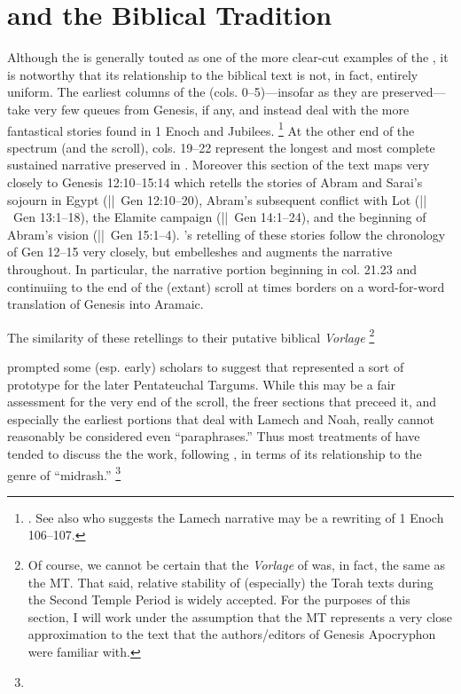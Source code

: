 \section{\ga and the Biblical Tradition}

Although the \ga is generally touted as one of the more clear-cut examples of the \rwb, it is notworthy that its relationship to the biblical text is not, in fact, entirely uniform. The earliest columns of the \ga (cols. 0--5)---insofar as they are preserved---take very few queues from Genesis, if any, and instead deal with the more fantastical stories found in 1 Enoch and Jubilees.%
%
\footnote{\cite[333]{bernstein_berthelot-etal2010}. See also \cite[174]{nickelsburg2005} who suggests the Lamech narrative may be a rewriting of 1 Enoch 106--107.}
At the other end of the spectrum (and the scroll), cols. 19--22 represent the longest and most complete sustained narrative preserved in \ga. Moreover this section of the text maps very closely to Genesis 12:10--15:14 which retells the stories of Abram and Sarai's sojourn in Egypt (||~Gen 12:10--20), Abram's subsequent conflict with Lot (||~Gen 13:1--18), the Elamite campaign (||~Gen 14:1--24), and the beginning of Abram's vision (||~Gen 15:1--4). \ga's retelling of these stories follow the chronology of Gen 12--15 very closely, but \ga embelleshes and augments the narrative throughout. In particular, the narrative portion beginning in col. 21.23 and continuiing to the end of the (extant) scroll at times borders on a word-for-word translation of Genesis into Aramaic.

The similarity of these retellings to their putative biblical \emph{Vorlage}%
%
\footnote{Of course, we cannot be certain that the \emph{Vorlage} of \ga was, in fact, the same as the MT. That said, relative stability of (especially) the Torah texts during the Second Temple Period is widely accepted. For the purposes of this section, I will work under the assumption that the MT represents a very close approximation to the text that the authors/editors of Genesis Apocryphon were familiar with.}

prompted some (esp. early) scholars to suggest that \ga represented a sort of prototype for the later Pentateuchal Targums.\autocite[193]{black1983} While this may be a fair assessment for the very end of the scroll, the freer sections that preceed it, and especially the earliest portions that deal with Lamech and Noah, really cannot reasonably be considered even ``paraphrases.'' Thus most treatments of \ga have tended to discuss the the work, following \vermes, in terms of its relationship to the genre of ``midrash.''\autocite{vermes1961}%
%
\footnote{}

